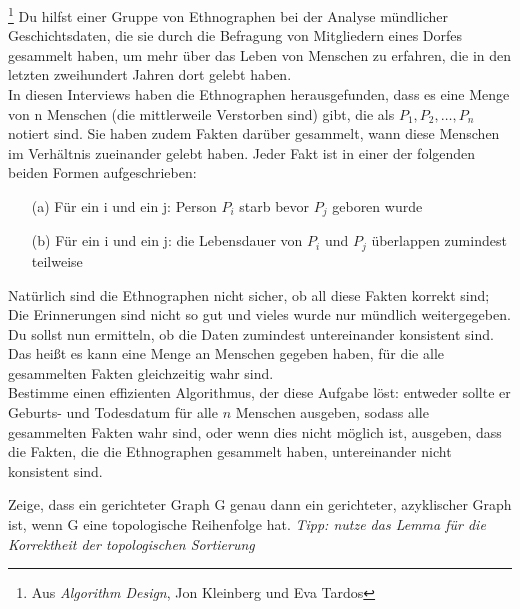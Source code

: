\documentclass{uebung_cs}
\begin{document}
\begin{aufgabe}\footnote{Aus \textit{Algorithm Design}, Jon Kleinberg und Eva Tardos}
Du hilfst einer Gruppe von Ethnographen bei der Analyse mündlicher Geschichtsdaten, die sie durch die Befragung von Mitgliedern eines Dorfes gesammelt haben, um mehr über das Leben von Menschen zu erfahren, die in den letzten zweihundert Jahren dort gelebt haben.\\
In diesen Interviews haben die Ethnographen herausgefunden, dass es eine Menge von n Menschen (die mittlerweile Verstorben sind) gibt, die als $P_1, P_2, \ldots, P_n$ notiert sind.
Sie haben zudem Fakten darüber gesammelt, wann diese Menschen im Verhältnis zueinander gelebt haben. Jeder Fakt ist in einer der folgenden beiden Formen aufgeschrieben:
\begin{enumerate}
	\item[(a)] Für ein i und ein j: Person $P_i$ starb bevor $P_j$ geboren wurde
	\item[(b)] Für ein i und ein j: die Lebensdauer von $P_i$ und $P_j$ überlappen zumindest teilweise
\end{enumerate}
Natürlich sind die Ethnographen nicht sicher, ob all diese Fakten korrekt sind; Die Erinnerungen sind nicht so gut und vieles wurde nur mündlich weitergegeben.
Du sollst nun ermitteln, ob die Daten zumindest untereinander konsistent sind.
Das heißt es kann eine Menge an Menschen gegeben haben, für die alle gesammelten Fakten gleichzeitig wahr sind.\\
Bestimme einen effizienten Algorithmus, der diese Aufgabe löst: entweder sollte er Geburts- und Todesdatum für alle $n$ Menschen ausgeben, sodass alle gesammelten Fakten wahr sind, oder wenn dies nicht möglich ist, ausgeben, dass die Fakten, die die Ethnographen gesammelt haben, untereinander nicht konsistent sind. 
\end{aufgabe}


\begin{aufgabe}
Zeige, dass ein gerichteter Graph G genau dann ein gerichteter, azyklischer Graph ist, wenn G eine topologische Reihenfolge hat.
\textit{Tipp: nutze das Lemma für die Korrektheit der topologischen Sortierung}
\end{aufgabe}
\end{document}
